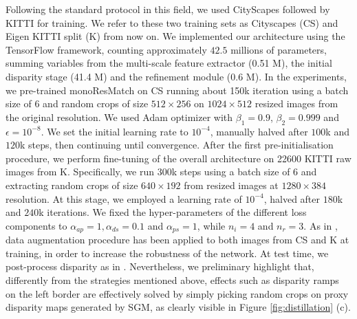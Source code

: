 \documentclass[10pt,twocolumn,letterpaper]{article}
\begin{document}
Following the standard protocol in this field, we used CityScapes followed by KITTI for training. We refer to these two training sets as Cityscapes (CS) and Eigen KITTI split (K) from now on. We implemented our architecture using the TensorFlow framework, counting approximately $42.5$ millions of parameters, summing variables from the multi-scale feature extractor (0.51 M), the initial disparity stage (41.4 M) and the refinement module (0.6 M). 
In the experiments, we pre-trained monoResMatch on CS running about 150k iteration using a batch size of 6 and random crops of size $512 \times 256$ on $1024 \times 512 $ resized images from the original resolution. We used Adam optimizer \cite{kingma2014adam} with $\beta_{1} = 0.9$, $\beta_{2} = 0.999$ and $\epsilon=10^{-8}$. We set the initial learning rate to $10^{-4}$, manually halved after $100$k and $120$k steps, then continuing until convergence. After the first pre-initialisation procedure, we perform fine-tuning of the overall architecture on 22600 KITTI raw images from K. Specifically, we run $300$k steps using a batch size of 6 and extracting random crops of size $640\times192$ from resized images at $1280\times384$ resolution. At this stage, we employed a learning rate of $10^{-4}$, halved after $180$k and $240$k iterations. We fixed the hyper-parameters of the different loss components to $\alpha_{ap}=1, \alpha_{ds}=0.1$ and $\alpha_{ps}=1$, while $n_i=4$ and $n_r=3$.
As in \cite{monodepth17}, data augmentation procedure has been applied to both images from CS and K at training, in order to increase the robustness of the network. At test time, we post-process disparity as in \cite{monodepth17,3net18,yang2018deep}. Nevertheless, we preliminary highlight that, differently from the strategies mentioned above, effects such as disparity ramps on the left border are effectively solved by simply picking random crops on proxy disparity maps generated by SGM, as clearly visible in Figure \ref{fig:distillation} (c).
\end{document}
